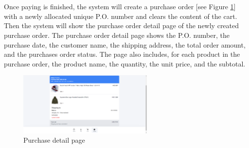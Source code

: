 \documentclass{article}
\begin{document}
\\\\
Once paying is finished, the system will create a purchase order [see Figure \ref{fig:purchase detail page}] with a newly allocated unique P.O. number and clears the content of the cart. Then the system will show the purchase order detail page of the newly created purchase order. The purchase order detail page shows the P.O. number, the purchase date, the customer name, the shipping address, the total order amount, and the purchases order status. The page also includes, for each product in the purchase order, the product name, the quantity, the unit price, and the subtotal. 
\begin{figure}[!htp]
    \centering
    \includegraphics[width=0.6\textwidth]{purchase detail page.png}
    \caption{\label{fig:purchase detail page}Purchase detail page }
\end{figure}
\end{document}
